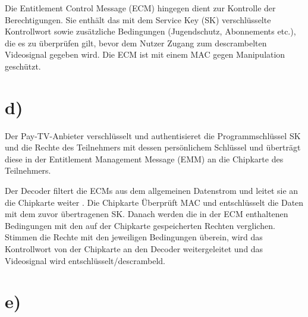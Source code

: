 \documentclass[12pt.twoside,a4paper,notitlepage]{article}
\begin{document}
Die Entitlement Control Message (ECM) hingegen dient zur Kontrolle der Berechtigungen. Sie enthält das mit dem Service Key (SK) verschlüsselte Kontrollwort sowie zusätzliche Bedingungen (Jugendschutz, Abonnements etc.), die es zu überprüfen gilt, bevor dem Nutzer Zugang zum descrambelten Videosignal gegeben wird. Die ECM ist mit einem MAC gegen Manipulation geschützt. 

\section*{d)}
Der Pay-TV-Anbieter verschlüsselt und authentisieret die Programmschlüssel SK und die Rechte des Teilnehmers mit dessen persönlichem Schlüssel  und überträgt diese in der Entitlement Management Message (EMM) an die Chipkarte des Teilnehmers.

Der Decoder filtert die ECMs aus dem allgemeinen Datenstrom  und leitet sie an die Chipkarte weiter . Die Chipkarte Überprüft MAC  und entschlüsselt die Daten mit dem zuvor übertragenen SK. Danach werden die in der ECM enthaltenen Bedingungen mit den auf der Chipkarte gespeicherten Rechten verglichen. Stimmen  die Rechte mit den jeweiligen Bedingungen überein, wird das Kontrollwort von der Chipkarte an den Decoder weitergeleitet und das Videosignal wird entschlüsselt/descrambeld.

\section*{e)}
\end{document}
